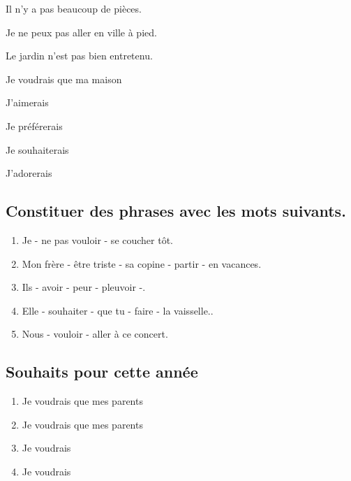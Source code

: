 \documentclass[12pt]{article}
\begin{document}
Il n’y a pas beaucoup de pièces.


Je ne peux pas aller en ville à pied.


Le jardin n’est pas bien entretenu.


Je voudrais que ma maison


J’aimerais


Je préférerais


Je souhaiterais


J’adorerais


\subsection{Constituer des phrases avec les mots suivants.}
\begin{enumerate}
	\item Je - ne pas vouloir - se coucher tôt.
	\item Mon frère - être triste - sa copine - partir - en vacances.
	\item Ils - avoir - peur - pleuvoir -.
	\item Elle - souhaiter - que tu - faire - la vaisselle..
	\item Nous - vouloir - aller à ce concert.
\end{enumerate}
\subsection{Souhaits pour cette année}
\begin{enumerate}
\item Je voudrais que mes parents

\item Je voudrais que mes parents

\item Je voudrais

\item Je voudrais

\end{enumerate}
\end{document}
